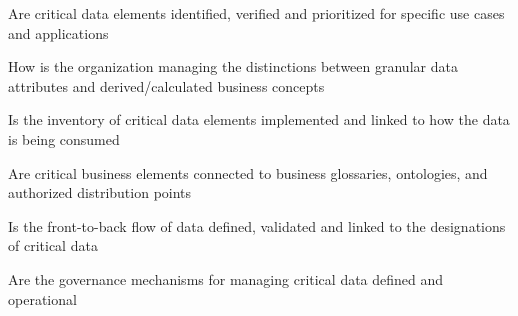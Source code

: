 \begin{core-questions}

  \item [\thesection.1] Are critical data elements identified, verified and prioritized for specific
                        use cases and applications
  \item [\thesection.2] How is the organization managing the distinctions between granular data attributes and
                        derived/calculated business concepts
  \item [\thesection.3] Is the inventory of critical data elements implemented and linked to how the
                        data is being consumed
  \item [\thesection.4] Are critical business elements connected to business glossaries, ontologies,
                         and authorized distribution points
  \item [\thesection.5] Is the front-to-back flow of data defined, validated and linked to the designations of
                        critical data
  \item [\thesection.6] Are the governance mechanisms for managing critical data defined and operational

\end{core-questions}

